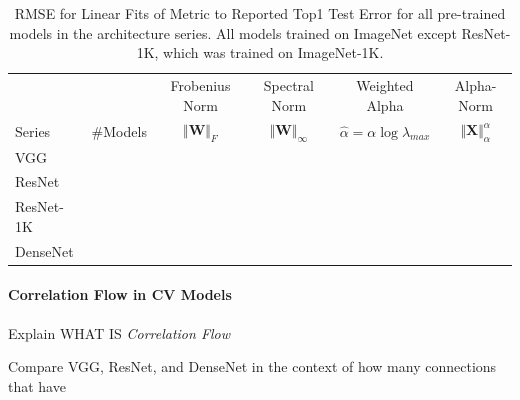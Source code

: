 \begin{table}[t]
\small
\begin{center}
\begin{tabular}{|p{1in}|c|c|c|c|c|}
\hline
   &    & Frobenius Norm & Spectral Norm & Weighted Alpha & Alpha-Norm \\
 Series & \#Models   & $\Vert\mathbf{W}\Vert_{F}$ & $\Vert\mathbf{W}\Vert_{\infty}$ & $\hat{\alpha}=\alpha\log\lambda_{max}$ & $\Vert\mathbf{X}\Vert^{\alpha}_{\alpha}$ \\
\hline
 VGG & & & & \\
 ResNet & & & & \\
 ResNet-1K & & & & \\
 DenseNet & & & & \\
\hline
\end{tabular}
\end{center}
\caption{RMSE for Linear Fits of Metric to Reported Top1 Test Error for all pre-trained models in the architecture series.  All models trained on ImageNet except ResNet-1K, which was trained on ImageNet-1K. }
\label{table:models}
\end{table}



\paragraph{Correlation Flow in CV Models}

Explain WHAT IS \emph{Correlation Flow}

Compare VGG, ResNet, and DenseNet in the context of how many connections that have

